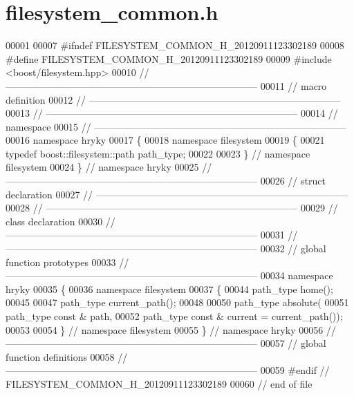 \hypertarget{filesystem__common_8h_source}{\section{filesystem\-\_\-common.\-h}
}

\begin{DoxyCode}
00001 
00007 \textcolor{preprocessor}{#ifndef FILESYSTEM\_COMMON\_H\_20120911123302189}
00008 \textcolor{preprocessor}{}\textcolor{preprocessor}{#define FILESYSTEM\_COMMON\_H\_20120911123302189}
00009 \textcolor{preprocessor}{}\textcolor{preprocessor}{#include <boost/filesystem.hpp>}
00010 \textcolor{comment}{//
      ------------------------------------------------------------------------------}
00011 \textcolor{comment}{// macro definition}
00012 \textcolor{comment}{//
      ------------------------------------------------------------------------------}
00013 \textcolor{comment}{//
      ------------------------------------------------------------------------------}
00014 \textcolor{comment}{// namespace}
00015 \textcolor{comment}{//
      ------------------------------------------------------------------------------}
00016 \textcolor{keyword}{namespace }hryky
00017 \{
00018 \textcolor{keyword}{namespace }filesystem
00019 \{
00021     \textcolor{keyword}{typedef} boost::filesystem::path     path\_type;
00022 
00023 \} \textcolor{comment}{// namespace filesystem}
00024 \} \textcolor{comment}{// namespace hryky}
00025 \textcolor{comment}{//
      ------------------------------------------------------------------------------}
00026 \textcolor{comment}{// struct declaration}
00027 \textcolor{comment}{//
      ------------------------------------------------------------------------------}
00028 \textcolor{comment}{//
      ------------------------------------------------------------------------------}
00029 \textcolor{comment}{// class declaration}
00030 \textcolor{comment}{//
      ------------------------------------------------------------------------------}
00031 \textcolor{comment}{//
      ------------------------------------------------------------------------------}
00032 \textcolor{comment}{// global function prototypes}
00033 \textcolor{comment}{//
      ------------------------------------------------------------------------------}
00034 \textcolor{keyword}{namespace }hryky
00035 \{
00036 \textcolor{keyword}{namespace }filesystem
00037 \{
00044     path\_type home();
00045 
00047     path\_type current\_path();
00048 
00050     path\_type absolute(
00051         path\_type \textcolor{keyword}{const} & path,
00052         path\_type \textcolor{keyword}{const} & current = current\_path());
00053 
00054 \} \textcolor{comment}{// namespace filesystem}
00055 \} \textcolor{comment}{// namespace hryky}
00056 \textcolor{comment}{//
      ------------------------------------------------------------------------------}
00057 \textcolor{comment}{// global function definitions}
00058 \textcolor{comment}{//
      ------------------------------------------------------------------------------}
00059 \textcolor{preprocessor}{#endif // FILESYSTEM\_COMMON\_H\_20120911123302189}
00060 \textcolor{preprocessor}{}\textcolor{comment}{// end of file}
\end{DoxyCode}

